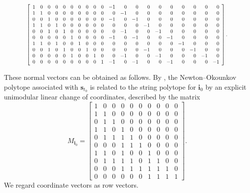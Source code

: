 \documentclass[10pt]{amsart}
\numberwithin{equation}{section}
\theoremstyle{plain}
\theoremstyle{definition}
\theoremstyle{remark}
\begin{document}
\begin{equation}\label{eq:facet normal vectors}
	\resizebox{0.85\textwidth}{!}{$
		\left[
		\begin{array}{*{20}{r}}
			1 & 0 & 0 & 0 & 0 & 0 & 0 & 0 & 0 & 0 & -1 & 0 & 0 & 0 & 0 & 0 & 0 & 0 & 0 & 0 \\
			1 & 1 & 0 & 0 & 0 & 0 & 0 & 0 & 0 & 0 & 0 & -1 & 0 & 0 & 0 & 0 & 0 & 0 & 0 & 0 \\
			0 & 0 & 1 & 0 & 0 & 0 & 0 & 0 & 0 & 0 & -1 & 0 & -1 & 0 & 0 & 0 & 0 & 0 & 0 & 0 \\
			1 & 1 & 0 & 1 & 0 & 0 & 0 & 0 & 0 & 0 & 0 & 0 & 0 & -1 & 0 & 0 & 0 & 0 & 0 & 0 \\
			0&0&1&0&1&0&0&0&0&0&0&-1&0&0&-1&0&0&0&0&0\\
			0 & 0 & 0 & 0 & 0 & 1 & 0 & 0 & 0 & 0 & -1 & 0 & -1 & 0 & 0 & -1 & 0 & 0 & 0 & 0 \\
			1 & 1 & 0 & 1 & 0 & 0 & 1 & 0 & 0 & 0 & 0 & 0 & 0 & 0 & 0 & 0 & -1 & 0 & 0 & 0 \\
0&0&1&0&1&0&0&1&0&0&0&0&0&-1&0&0&0&-1&0&0\\
0&0&0&0&0&1&0&0&1&0&0&-1&0&0&-1&0&0&0&-1&0\\
0&0&0&0&0&0&0&0&0&1&-1&0&-1&0&0&-1&0&0&0&-1
		\end{array}		
		\right].
		$}
\end{equation}

These normal vectors can be obtained as follows. 
By \cite[Corollary~6.6]{FujitaOya}, the Newton--Okounkov polytope associated with $\mathbf s_{t_0}$ is related to the string polytope for ${\bm i}_0$ by an explicit unimodular linear change of coordinates, described by the matrix 
\[
M_{\bm i_0}=\begin{bmatrix}
	1&0&0&0&0&0&0&0&0&0\\
	1&1&0&0&0&0&0&0&0&0\\
	0&1&1&0&0&0&0&0&0&0\\
	1&1&0&1&0&0&0&0&0&0\\
	0&1&1&1&1&0&0&0&0&0\\
	0&0&0&1&1&1&0&0&0&0\\
	1&1&0&1&0&0&1&0&0&0\\
	0&1&1&1&1&0&1&1&0&0\\
	0&0&0&1&1&1&1&1&1&0\\
	0&0&0&0&0&0&1&1&1&1
\end{bmatrix}.
\]
We regard coordinate vectors as row vectors. 
 
\end{document}

